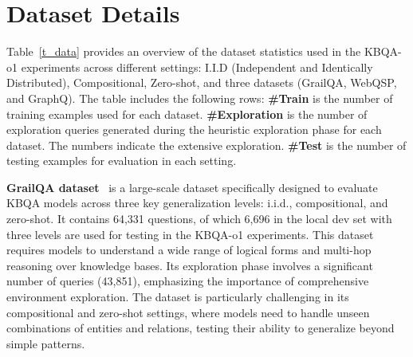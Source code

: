 \documentclass{article}
\theoremstyle{plain}
\theoremstyle{definition}
\theoremstyle{remark}
\begin{document}
\section{Dataset Details}
\label{dataset}

Table~\ref{t_data} provides an overview of the dataset statistics used in the KBQA-o1 experiments across different settings: I.I.D (Independent and Identically Distributed), Compositional, Zero-shot, and three datasets (GrailQA, WebQSP, and GraphQ). The table includes the following rows: \textbf{\#Train} is the number of training examples used for each dataset. \textbf{\#Exploration} is the number of exploration queries generated during the heuristic exploration phase for each dataset. The numbers indicate the extensive exploration. \textbf{\#Test} is the number of testing examples for evaluation in each setting.

\begin{table}[h!t]
\caption{\label{t_data}
Dataset statistics of KBQA-o1.}
\vskip 0.1in
\centering
{}
\end{table}

\textbf{GrailQA dataset}~\citep{GrailQA} is a large-scale dataset specifically designed to evaluate KBQA models across three key generalization levels: i.i.d., compositional, and zero-shot. It contains 64,331 questions, of which 6,696 in the local dev set with three levels are used for testing in the KBQA-o1 experiments. This dataset requires models to understand a wide range of logical forms and multi-hop reasoning over knowledge bases. Its exploration phase involves a significant number of queries (43,851), emphasizing the importance of comprehensive environment exploration. The dataset is particularly challenging in its compositional and zero-shot settings, where models need to handle unseen combinations of entities and relations, testing their ability to generalize beyond simple patterns.
\end{document}
